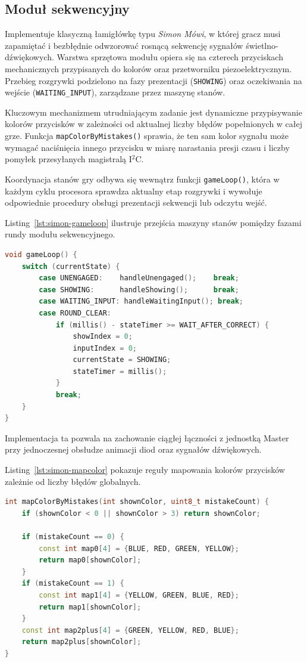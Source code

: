 \documentclass{SGGW-thesis}
\begin{document}
\subsection{Moduł sekwencyjny} Implementuje klasyczną łamigłówkę typu \textit{Simon Mówi}, w której gracz musi zapamiętać i bezbłędnie odwzorować rosnącą sekwencję sygnałów świetlno-dźwiękowych. Warstwa sprzętowa modułu opiera się na czterech przyciskach mechanicznych przypisanych do kolorów oraz przetworniku piezoelektrycznym. Przebieg rozgrywki podzielono na fazy prezentacji (\texttt{SHOWING}) oraz oczekiwania na wejście (\texttt{WAITING\_INPUT}), zarządzane przez maszynę stanów.

Kluczowym mechanizmem utrudniającym zadanie jest dynamiczne przypisywanie kolorów przycisków w zależności od aktualnej liczby błędów popełnionych w całej grze. Funkcja \texttt{mapColorByMistakes()} sprawia, że ten sam kolor sygnału może wymagać naciśnięcia innego przycisku w miarę narastania presji czasu i liczby pomyłek przesyłanych magistralą I$^2$C.

Koordynacja stanów gry odbywa się wewnątrz funkcji \texttt{gameLoop()}, która w każdym cyklu procesora sprawdza aktualny etap rozgrywki i wywołuje odpowiednie procedury obsługi prezentacji sekwencji lub odczytu wejść.

Listing~\ref{lst:simon-gameloop} ilustruje przejścia maszyny stanów pomiędzy fazami rundy modułu sekwencyjnego.
\begin{lstlisting}[language=C++, caption={Główna pętla logiczna modułu sekwencyjnego (SimonSays.ino)}, label={lst:simon-gameloop}]
void gameLoop() {
    switch (currentState) {
        case UNENGAGED:    handleUnengaged();    break;
        case SHOWING:      handleShowing();      break;
        case WAITING_INPUT: handleWaitingInput(); break;
        case ROUND_CLEAR: 
            if (millis() - stateTimer >= WAIT_AFTER_CORRECT) {
                showIndex = 0;
                inputIndex = 0; 
                currentState = SHOWING;
                stateTimer = millis();
            }
            break;
    }
}
\end{lstlisting}

Implementacja ta pozwala na zachowanie ciągłej łączności z jednostką Master przy jednoczesnej obsłudze animacji diod oraz sygnałów dźwiękowych.

Listing~\ref{lst:simon-mapcolor} pokazuje reguły mapowania kolorów przycisków zależnie od liczby błędów globalnych.
\begin{lstlisting}[language=C++, caption={Dynamiczne przypisywanie układu klawiszy w zależności od liczby błędów (SimonSays.ino)}, label={lst:simon-mapcolor}]
int mapColorByMistakes(int shownColor, uint8_t mistakeCount) {
    if (shownColor < 0 || shownColor > 3) return shownColor;

    if (mistakeCount == 0) {
        const int map0[4] = {BLUE, RED, GREEN, YELLOW};
        return map0[shownColor];
    }
    if (mistakeCount == 1) {
        const int map1[4] = {YELLOW, GREEN, BLUE, RED};
        return map1[shownColor];
    }
    const int map2plus[4] = {GREEN, YELLOW, RED, BLUE};
    return map2plus[shownColor];
}
\end{lstlisting}
\end{document}
